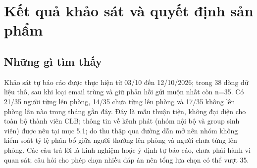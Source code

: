 \section{Kết quả khảo sát và quyết định sản phẩm}
\subsection{Những gì tìm thấy}
Khảo sát tự báo cáo được thực hiện từ 03/10 đến 12/10/2026; trong 38 dòng dữ liệu thô, sau khi loại email trùng và giữ phản hồi gửi muộn nhất còn n=35. Có 21/35 người từng lên phòng, 14/35 chưa từng lên phòng và 17/35 không lên phòng lần nào trong tháng gần đây. Đây là mẫu thuận tiện, không đại diện cho toàn bộ thành viên CLB; thông tin về kênh phát (nhóm nội bộ và group sinh viên) được nêu tại mục 5.1; do thu thập qua đường dẫn mở nên nhóm không kiểm soát tỷ lệ phân bổ giữa người thường lên phòng và người chưa từng lên phòng. Các câu trả lời là kinh nghiệm hoặc ý định tự báo cáo, chưa phải hành vi quan sát; câu hỏi cho phép chọn nhiều đáp án nên tổng lựa chọn có thể vượt 35.
\par
\setlength{\tabcolsep}{4pt}
\setlength{\extrarowheight}{1pt}
